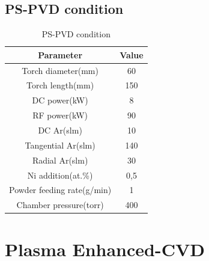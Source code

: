 \subsection{PS-PVD condition}
\begin{table}[H]
\centering
\caption{PS-PVD condition}
\begin{tabular}{cc}
\toprule
Parameter & Value\\
\midrule
Torch diameter(mm) & 60 \\
Torch length(mm) & 150 \\
DC power(kW) & 8 \\
RF power(kW) & 90 \\
DC Ar(slm) & 10 \\
Tangential Ar(slm) & 140 \\
Radial Ar(slm) & 30 \\
Ni addition(at.\%) & 0,5 \\
Powder feeding rate(g/min) & 1 \\
Chamber pressure(torr) & 400 \\
\bottomrule
\end{tabular}
\end{table}
\section{Plasma Enhanced-CVD}
